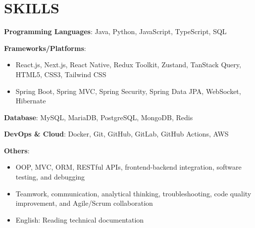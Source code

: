\section{SKILLS}
\resumeSubHeadingListStart

  \item
    \resumeItemListStart
      \item \textbf{Programming Languages}: Java, Python, JavaScript, TypeScript, SQL
      \item \textbf{Frameworks/Platforms}:
        \begin{itemize}
          \item React.js, Next.js, React Native, Redux Toolkit, Zustand, TanStack Query, HTML5, CSS3, Tailwind CSS
          \item Spring Boot, Spring MVC, Spring Security, Spring Data JPA, WebSocket, Hibernate
        \end{itemize}
      \item \textbf{Database}: MySQL, MariaDB, PostgreSQL, MongoDB, Redis
      \item \textbf{DevOps \& Cloud}: Docker, Git, GitHub, GitLab, GitHub Actions, AWS
      \item \textbf{Others}:
        \begin{itemize}
          \item OOP, MVC, ORM, RESTful APIs, frontend-backend integration, software testing, and debugging
          \item Teamwork, communication, analytical thinking, troubleshooting, code quality improvement, and Agile/Scrum collaboration
          \item English: Reading technical documentation
        \end{itemize}
    \resumeItemListEnd

\resumeSubHeadingListEnd
